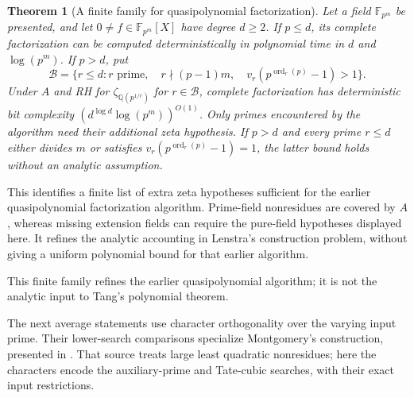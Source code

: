 \documentclass[11pt]{article}
\newcommand{\Q}{\mathbb Q}
\newcommand{\F}{\mathbb F}
\newcommand{\ord}{\operatorname{ord}}
\newtheorem{theorem}{Theorem}[section]
\theoremstyle{definition}
\theoremstyle{remark}
\begin{document}
\begin{theorem}[A finite family for quasipolynomial factorization]
\label{thm:quasipoly}
Let a field $\F_{p^m}$ be presented, and let
$0\ne f\in\F_{p^m}[X]$ have degree $d\geq2$.
If $p\leq d$, its complete factorization can be
computed deterministically in polynomial time in
$d$ and $\log(p^m)$.  If $p>d$, put
\[
 \mathcal B=\{r\leq d: r\text{ prime},\quad
 r\nmid(p-1)m,\quad v_r(p^{\ord_r(p)}-1)>1\}.
\]
Under $A$ and RH for $\zeta_{\Q(p^{1/r})}$ for
$r\in\mathcal B$, complete factorization has
deterministic bit complexity
$(d^{\log d}\log(p^m))^{O(1)}$.
Only primes encountered by the algorithm need their
additional zeta hypothesis.  If $p>d$ and every prime $r\leq d$
either divides $m$ or satisfies
$v_r(p^{\ord_r(p)}-1)=1$, the latter bound holds
without an analytic assumption.
\end{theorem}

This identifies a finite list of extra zeta hypotheses sufficient for
the earlier quasipolynomial factorization algorithm. Prime-field
nonresidues are covered by \(A\), whereas missing extension fields
can require the pure-field hypotheses displayed here. It refines the
analytic accounting in Lenstra's construction problem, without giving
a uniform polynomial bound for that earlier algorithm.


This finite family refines the earlier quasipolynomial algorithm; it is
not the analytic input to Tang's polynomial theorem.

The next average statements use character orthogonality over the varying input prime. Their lower-search comparisons specialize Montgomery's construction, presented in \citet[p.~432, Exercise~9(a)--(e)]{MontgomeryVaughan2007}. That source treats large least quadratic nonresidues; here the characters encode the auxiliary-prime and Tate-cubic searches, with their exact input restrictions.
\end{document}
